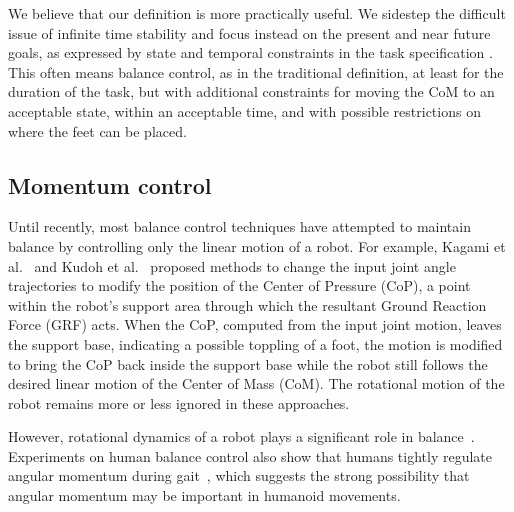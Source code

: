 \documentclass{llncs}
\begin{document}
We believe that our definition is more practically useful.
We sidestep the difficult issue of infinite time stability and focus instead on the present and near future
goals, as expressed by state and temporal constraints in the task specification \cite{hofmann2015temporally}.
This often means balance control, as in the traditional definition, at least for the duration of the task,
but with additional constraints
for moving the CoM to an acceptable state, within an acceptable time, and with possible restrictions
on where the feet can be placed.




\subsection{Momentum control}


Until recently, most balance control techniques
have attempted to maintain balance by controlling
only the linear motion of a robot.
For example, Kagami et al.~\cite{Kagami00} and
Kudoh et al.~\cite{Kudoh02} proposed methods to change
the input joint angle trajectories to modify the position of the
Center of Pressure (CoP), a point within the robot's support area through
which the resultant Ground Reaction Force (GRF) acts.
When the CoP, computed from the input joint motion, leaves the
support base, indicating a possible toppling of a foot,
the motion is modified to bring the CoP back inside the
support base while the robot still follows the desired linear
motion of the Center of Mass (CoM). The rotational motion of the
robot remains more or less ignored in these approaches.

However, rotational dynamics of a robot plays a
significant role in balance~\cite{KLKK05}.
Experiments on human balance control also show that
humans tightly regulate angular momentum during gait~\cite{PHH04},
which suggests the strong possibility that angular momentum
may be important in humanoid movements.
\end{document}
